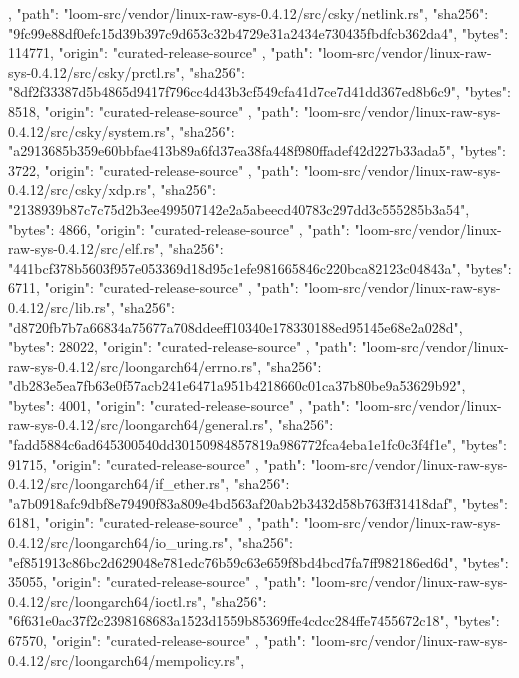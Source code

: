 {{    },
    {
      "path": "loom-src/vendor/linux-raw-sys-0.4.12/src/csky/netlink.rs",
      "sha256": "9fc99e88df0efc15d39b397c9d653c32b4729e31a2434e730435fbdfcb362da4",
      "bytes": 114771,
      "origin": "curated-release-source"
    },
    {
      "path": "loom-src/vendor/linux-raw-sys-0.4.12/src/csky/prctl.rs",
      "sha256": "8df2f33387d5b4865d9417f796cc4d43b3cf549cfa41d7ce7d41dd367ed8b6c9",
      "bytes": 8518,
      "origin": "curated-release-source"
    },
    {
      "path": "loom-src/vendor/linux-raw-sys-0.4.12/src/csky/system.rs",
      "sha256": "a2913685b359e60bbfae413b89a6fd37ea38fa448f980ffadef42d227b33ada5",
      "bytes": 3722,
      "origin": "curated-release-source"
    },
    {
      "path": "loom-src/vendor/linux-raw-sys-0.4.12/src/csky/xdp.rs",
      "sha256": "2138939b87c7c75d2b3ee499507142e2a5abeecd40783c297dd3c555285b3a54",
      "bytes": 4866,
      "origin": "curated-release-source"
    },
    {
      "path": "loom-src/vendor/linux-raw-sys-0.4.12/src/elf.rs",
      "sha256": "441bcf378b5603f957e053369d18d95c1efe981665846c220bca82123c04843a",
      "bytes": 6711,
      "origin": "curated-release-source"
    },
    {
      "path": "loom-src/vendor/linux-raw-sys-0.4.12/src/lib.rs",
      "sha256": "d8720fb7b7a66834a75677a708ddeeff10340e178330188ed95145e68e2a028d",
      "bytes": 28022,
      "origin": "curated-release-source"
    },
    {
      "path": "loom-src/vendor/linux-raw-sys-0.4.12/src/loongarch64/errno.rs",
      "sha256": "db283e5ea7fb63e0f57acb241e6471a951b4218660c01ca37b80be9a53629b92",
      "bytes": 4001,
      "origin": "curated-release-source"
    },
    {
      "path": "loom-src/vendor/linux-raw-sys-0.4.12/src/loongarch64/general.rs",
      "sha256": "fadd5884c6ad645300540dd30150984857819a986772fca4eba1e1fc0c3f4f1e",
      "bytes": 91715,
      "origin": "curated-release-source"
    },
    {
      "path": "loom-src/vendor/linux-raw-sys-0.4.12/src/loongarch64/if_ether.rs",
      "sha256": "a7b0918afc9dbf8e79490f83a809e4bd563af20ab2b3432d58b763ff31418daf",
      "bytes": 6181,
      "origin": "curated-release-source"
    },
    {
      "path": "loom-src/vendor/linux-raw-sys-0.4.12/src/loongarch64/io_uring.rs",
      "sha256": "ef851913c86bc2d629048e781edc76b59c63e659f8bd4bcd7fa7ff982186ed6d",
      "bytes": 35055,
      "origin": "curated-release-source"
    },
    {
      "path": "loom-src/vendor/linux-raw-sys-0.4.12/src/loongarch64/ioctl.rs",
      "sha256": "6f631e0ac37f2c2398168683a1523d1559b85369ffe4cdcc284ffe7455672c18",
      "bytes": 67570,
      "origin": "curated-release-source"
    },
    {
      "path": "loom-src/vendor/linux-raw-sys-0.4.12/src/loongarch64/mempolicy.rs",
}}
